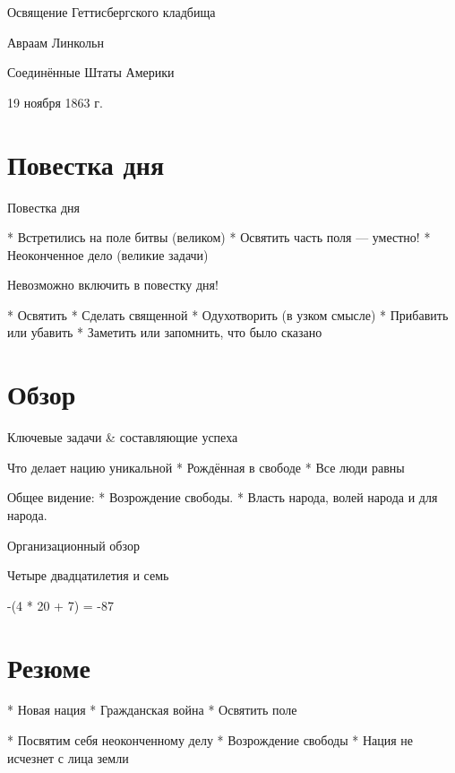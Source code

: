 \documentclass{beamer}
\begin{document}
Освящение Геттисбергского кладбища

Авраам Линкольн

Соединённые Штаты Америки

19 ноября 1863 г.

\section{Повестка дня}

Повестка дня

  * Встретились на поле битвы (великом)
  * Освятить часть поля --- уместно!
  * Неоконченное дело (великие задачи)

Невозможно включить в повестку дня!

  * Освятить
  * Сделать священной
  * Одухотворить (в узком смысле)
  * Прибавить или убавить
  * Заметить или запомнить, что было сказано

\section{Обзор}

Ключевые задачи \& составляющие успеха

Что делает нацию уникальной
  * Рождённая в свободе
  * Все люди равны

Общее видение:
  * Возрождение свободы.
  * Власть народа, волей народа и для народа.

Организационный обзор


Четыре двадцатилетия и семь

-(4 * 20 + 7) = -87

\section{Резюме}

* Новая нация
* Гражданская война
* Освятить поле

* Посвятим себя неоконченному делу
* Возрождение свободы
* Нация не исчезнет с лица земли
\end{document}

